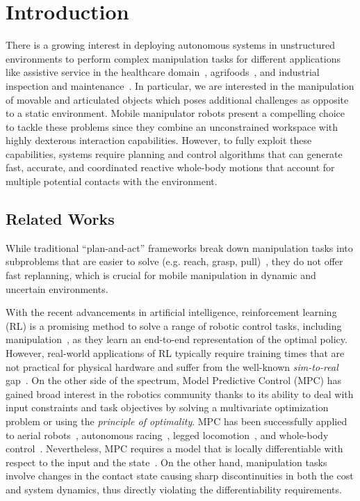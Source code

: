 \section{Introduction} \label{sec:introduction}
\showthe\font
There is a growing interest in deploying autonomous systems in unstructured environments to perform complex manipulation tasks for different applications like assistive service in the healthcare domain~\cite{cooper2020ari}, agrifoods~\cite{duckett2018agricultural}, and industrial inspection and maintenance~\cite{lattanzi2017review}. In particular, we are interested in the manipulation of movable and articulated objects which poses additional challenges as opposite to a static environment. Mobile manipulator robots present a compelling choice to tackle these problems since they combine an unconstrained workspace with highly dexterous interaction capabilities. However, to fully exploit these capabilities, systems require planning and control algorithms that can generate fast, accurate, and coordinated reactive whole-body motions that account for multiple potential contacts with the environment. 

\subsection{Related Works}

While traditional ``plan-and-act'' frameworks break down manipulation tasks into subproblems that are easier to solve (e.g. reach, grasp, pull)~\cite{Murali2020}, they do not offer fast replanning, which is crucial for mobile manipulation in dynamic and uncertain environments.

With the recent advancements in artificial intelligence, reinforcement learning (RL) is a promising method to solve a range of robotic control tasks, including manipulation~\cite{finn2016deep}, as they learn an end-to-end representation of the optimal policy. However, real-world applications of RL typically require training times that are not practical for physical hardware and suffer from the well-known \textit{sim-to-real} gap~\cite{chebotar2019closing}. 
On the other side of the spectrum, Model Predictive Control (MPC) has gained broad interest in the robotics community thanks to its ability to deal with input constraints and task objectives by solving a multivariate optimization problem or using the \textit{principle of optimality}. 
MPC has been successfully applied to aerial robots~\cite{peric2021direct}, autonomous racing~\cite{liniger2015optimization}, legged locomotion~\cite{grandia2019frequency}, and whole-body control~\cite{minniti2019whole}. 
Nevertheless, MPC requires a model that is locally differentiable with respect to the input and the state~\cite{buchli2017optimal}. On the other hand, manipulation tasks involve changes in the contact state causing sharp discontinuities in both the cost and system dynamics, thus directly violating the differentiability requirements. 


